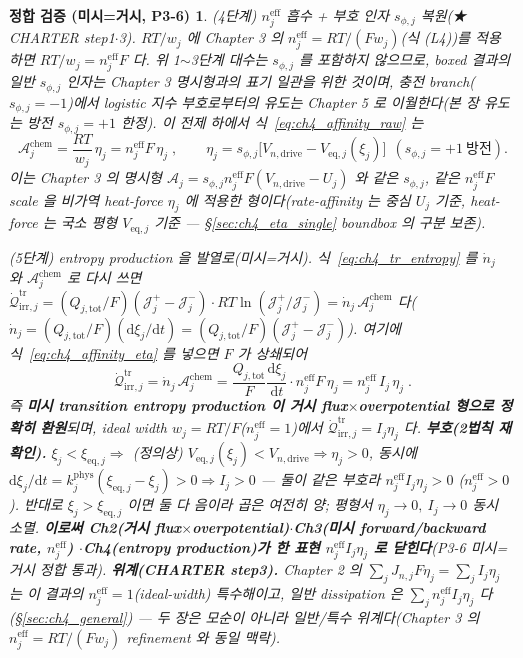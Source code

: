 \documentclass[11pt,a4paper]{article}
\newtheorem*{verifybox}{정합 검증 (미시=거시, P3-6)}
\newcommand{\dd}{\mathrm{d}}
\newcommand{\eff}{\mathrm{eff}}
\newcommand{\eq}{\mathrm{eq}}
\newcommand{\drive}{\mathrm{drive}}
\newcommand{\tot}{\mathrm{tot}}
\newcommand{\irr}{\mathrm{irr}}
\newcommand{\tr}{\mathrm{tr}}
\newcommand{\chem}{\mathrm{chem}}
\begin{document}
\begin{verifybox}
\emph{(4단계) $n_j^{\eff}$ 흡수 + 부호 인자 $s_{\phi,j}$ 복원(★ CHARTER step1$\cdot$3).} $RT/w_j$ 에 Chapter 3 의
$n_j^{\eff}=RT/(Fw_j)$(식 (L4))를 적용하면 $RT/w_j=n_j^{\eff}F$ 다. \emph{위 1$\sim$3단계 대수는 $s_{\phi,j}$ 를
포함하지 않으므로}, boxed 결과의 일반 $s_{\phi,j}$ 인자는 Chapter 3 명시형과의 \emph{표기 일관}을 위한 것이며,
충전 branch($s_{\phi,j}=-1$)에서 logistic 지수 부호로부터의 \emph{유도}는 Chapter 5 로 이월한다(본 장 유도는 방전
$s_{\phi,j}=+1$ 한정). 이 전제 하에서 식~\eqref{eq:ch4_affinity_raw} 는
\begin{equation}
\boxed{\;\mathcal A_j^{\chem}=\frac{RT}{w_j}\,\eta_j=n_j^{\eff}F\,\eta_j\;,\qquad
\eta_j=s_{\phi,j}\big[V_{n,\drive}-V_{\eq,j}(\xi_j)\big]\ \ (s_{\phi,j}=+1\ \text{방전}).}
\label{eq:ch4_affinity_eta}
\end{equation}
이는 Chapter 3 의 명시형 $\mathcal A_j=s_{\phi,j}n_j^{\eff}F(V_{n,\drive}-U_j)$ 와 \emph{같은 $s_{\phi,j}$,
같은 $n_j^{\eff}F$ scale} 을 비가역 \emph{heat-force} $\eta_j$ 에 적용한 형이다(rate-affinity 는 중심 $U_j$
기준, heat-force 는 국소 평형 $V_{\eq,j}$ 기준 — \S\ref{sec:ch4_eta_single} boundbox 의 구분 보존).

\emph{(5단계) entropy production 을 발열로(미시=거시).} 식~\eqref{eq:ch4_tr_entropy} 를 $\dot n_j$ 와
$\mathcal A_j^{\chem}$ 로 다시 쓰면 $\dot{\mathcal Q}_{\irr,j}^{\tr}=(Q_{j,\tot}/F)(\mathcal J_j^+-\mathcal J_j^-)
\cdot RT\ln(\mathcal J_j^+/\mathcal J_j^-)=\dot n_j\,\mathcal A_j^{\chem}$ 다($\dot n_j=(Q_{j,\tot}/F)(\dd\xi_j/\dd t)
=(Q_{j,\tot}/F)(\mathcal J_j^+-\mathcal J_j^-)$). 여기에 식~\eqref{eq:ch4_affinity_eta} 를 넣으면 $F$ 가 상쇄되어
\begin{equation}
\boxed{\;\dot{\mathcal Q}_{\irr,j}^{\tr}=\dot n_j\,\mathcal A_j^{\chem}
=\frac{Q_{j,\tot}}{F}\frac{\dd\xi_j}{\dd t}\cdot n_j^{\eff}F\,\eta_j
=n_j^{\eff}\,I_j\,\eta_j\;.}
\label{eq:ch4_micro_macro}
\end{equation}
즉 \textbf{미시 transition entropy production 이 거시 flux$\times$overpotential 형으로 정확히 환원}되며, ideal
width $w_j=RT/F$($n_j^{\eff}=1$)에서 $\dot{\mathcal Q}_{\irr,j}^{\tr}=I_j\eta_j$ 다. \textbf{부호(2법칙
재확인).} $\xi_j<\xi_{\eq,j}\Rightarrow$ (정의상) $V_{\eq,j}(\xi_j)<V_{n,\drive}\Rightarrow\eta_j>0$, 동시에
$\dd\xi_j/\dd t=k_j^{\mathrm{phys}}(\xi_{\eq,j}-\xi_j)>0\Rightarrow I_j>0$ — 둘이 같은 부호라 $n_j^{\eff}I_j\eta_j>0$
($n_j^{\eff}>0$). 반대로 $\xi_j>\xi_{\eq,j}$ 이면 둘 다 음이라 곱은 여전히 양; 평형서 $\eta_j\to0,\ I_j\to0$
동시 소멸. \textbf{이로써 Ch2(거시 flux$\times$overpotential)$\cdot$Ch3(미시 forward/backward rate, $n_j^{\eff}$)
$\cdot$Ch4(entropy production)가 한 표현 $n_j^{\eff}I_j\eta_j$ 로 닫힌다}(P3-6 미시=거시 정합 통과).
\textbf{위계(CHARTER step3).} \emph{Chapter 2 의 $\sum_j J_{n,j}F\eta_j=\sum_j I_j\eta_j$ 는 이 결과의
$n_j^{\eff}=1$(ideal-width) 특수해}이고, 일반 dissipation 은 $\sum_j n_j^{\eff}I_j\eta_j$ 다(\S\ref{sec:ch4_general})
— 두 장은 모순이 아니라 일반/특수 위계다(Chapter 3 의 $n_j^{\eff}=RT/(Fw_j)$ refinement 와 동일 맥락).
\end{verifybox}
\end{document}
